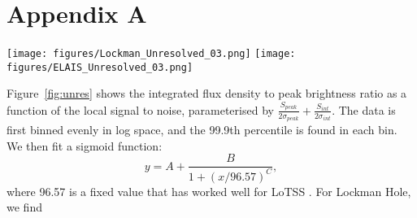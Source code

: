 \documentclass[usenatbib,fleqn,letters]{mnras}
\begin{document}
\section*{Appendix A}

\begin{figure*}
    \texttt{[image: figures/Lockman\_Unresolved\_03.png]}
    \hfill
    \texttt{[image: figures/ELAIS\_Unresolved\_03.png]}
    \caption{\label{fig:unres}The data and sigmoid fits to determine whether sources are resolved or unresolved as described in \S~\ref{subsec:highres}. The \textit{left} panel shows Lockman Hole, and the \textit{right} panel shows ELAIS-N1. }
\end{figure*}

Figure~\ref{fig:unres} shows the integrated flux density to peak brightness ratio as a function of the local signal to noise, parameterised by $\frac{S_{peak}}{2\sigma_{peak}} + \frac{S_{int}}{2\sigma_{int}}$. The data is first binned evenly in log space, and the 99.9th percentile is found in each bin. We then fit a sigmoid function:
\begin{equation}
y = A + \frac{B}{1 + (x / 96.57)^C}, 
\end{equation}
where 96.57 is a fixed value that has worked well for LoTSS \citep{shimwell_lofar_2022}. For Lockman Hole, we find 

\clearpage
\pagebreak





\label{lastpage}
\end{document}
